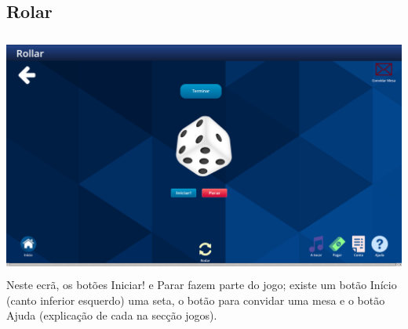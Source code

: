\documentclass{article}
\begin{document}
\subsection{Rolar}
\includegraphics[width=15cm, height=8cm]{user_manual_images/roll_game.png}
Neste ecrã, os botões Iniciar! e Parar fazem parte do jogo; existe um botão Início (canto inferior esquerdo) uma seta, o botão para convidar uma mesa e o botão Ajuda (explicação de cada na secção jogos).
\end{document}
